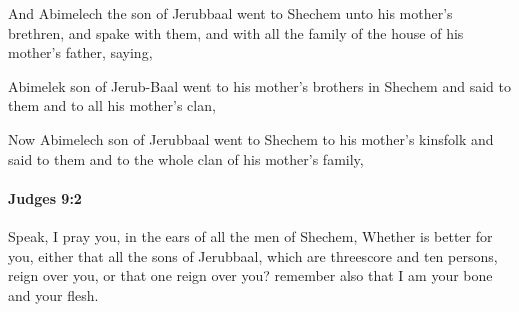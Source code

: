 			\begin{versebox}
					\item[BHS] 
					\item[ASV] And Abimelech the son of Jerubbaal went to Shechem unto his mother's brethren, and spake with them, and with all the family of the house of his mother's father, saying,
					\item[NIV] Abimelek son of Jerub-Baal went to his mother’s brothers in Shechem and said to them and to all his mother’s clan,
					\item[NRSV] Now Abimelech son of Jerubbaal went to Shechem to his mother’s kinsfolk and said to them and to the whole clan of his mother’s family,
			\end{versebox}

		\paragraph{Judges 9:2} %
			\label{JUDGES-9-2}

			Speak, I pray you, in the ears of all the men of Shechem, Whether is better for you, either that all the sons of Jerubbaal, which are threescore and ten persons, reign over you, or that one reign over you? remember also that I am your bone and your flesh.


